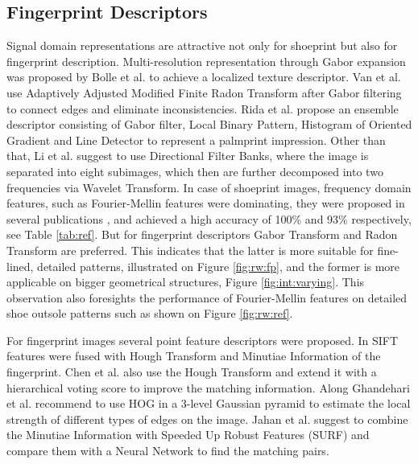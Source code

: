 \documentclass[draft,final]{vutinfth} %
\begin{document}
\subsection{Fingerprint Descriptors}
\par
Signal domain representations are attractive not only for shoeprint but also for fingerprint description.
Multi-resolution representation through Gabor expansion was proposed by Bolle et al. \cite{bolle2012fingerprint} to achieve a localized texture descriptor.
Van et al. \cite{van2016fingerprint} use Adaptively Adjusted Modified Finite Radon Transform after Gabor filtering to connect edges and eliminate inconsistencies.
Rida et al. \cite{rida2018palmprint} propose an ensemble descriptor consisting of Gabor filter, Local Binary Pattern, Histogram of Oriented Gradient and Line Detector to represent a palmprint impression.
Other than that, Li et al. \cite{li2012texture} suggest to use Directional Filter Banks, where the image is separated into eight subimages, which then are further decomposed into two frequencies via Wavelet Transform.
In case of shoeprint images, frequency domain features, such as Fourier-Mellin features were dominating, they were proposed in several publications  \cite{gueham2007automatic}, \cite{wu2019crime} and achieved a high accuracy of 100\% and 93\% respectively, see Table \ref{tab:ref}.
But for fingerprint descriptors Gabor Transform and Radon Transform are preferred.
This indicates that the latter is more suitable for fine-lined, detailed patterns, illustrated on Figure \ref{fig:rw:fp}, and the former is more applicable on bigger geometrical structures, Figure \ref{fig:int:varying}.
This observation also foresights the performance of Fourier-Mellin features on detailed shoe outsole patterns such as shown on Figure \ref{fig:rw:ref}. 
\par
For fingerprint images several point feature descriptors were proposed.
In \cite{zhou2011adaptive} SIFT \cite{lowe1999object} features were fused with Hough Transform and Minutiae Information of the fingerprint.
Chen et al. \cite{chen2013hierarchical} also use the Hough Transform and extend it with a hierarchical voting score to improve the matching information. 
Along  \cite{rida2018palmprint} Ghandehari et al. \cite{ghandehari2012palmprint} recommend to use HOG in a 3-level Gaussian pyramid to estimate the local strength of different types of edges on the image.
Jahan et al. \cite{jahan2017robust} suggest to combine the Minutiae Information with Speeded Up Robust Features (SURF) and compare them with a Neural Network to find the matching pairs.
\end{document}
